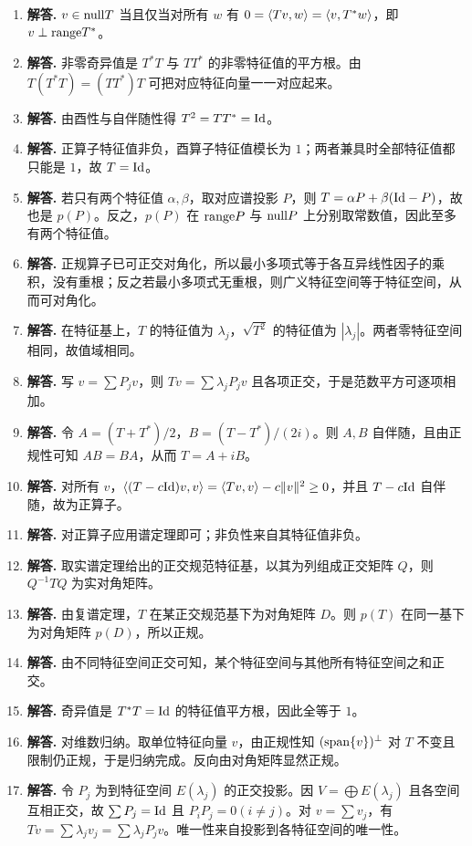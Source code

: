 \begin{enumerate}[label=\textbf{\arabic*.}, leftmargin=*, itemsep=1em]
\item \textbf{解答.} $v\in\mathrm{null} T$ 当且仅当对所有 $w$ 有 $0=\langle Tv, w \rangle=\langle v, T^*w \rangle$，即 $v\perp\mathrm{range} T^*$。
\item \textbf{解答.} 非零奇异值是 $T^*T$ 与 $TT^*$ 的非零特征值的平方根。由 $T(T^*T)=(TT^*)T$ 可把对应特征向量一一对应起来。
\item \textbf{解答.} 由酉性与自伴随性得 $T^2=TT^*=\mathrm{Id}$。
\item \textbf{解答.} 正算子特征值非负，酉算子特征值模长为 $1$；两者兼具时全部特征值都只能是 $1$，故 $T=\mathrm{Id}$。
\item \textbf{解答.} 若只有两个特征值 $\alpha,\beta$，取对应谱投影 $P$，则 $T=\alpha P+\beta(\mathrm{Id}-P)$，故也是 $p(P)$。反之，$p(P)$ 在 $\mathrm{range} P$ 与 $\mathrm{null} P$ 上分别取常数值，因此至多有两个特征值。
\item \textbf{解答.} 正规算子已可正交对角化，所以最小多项式等于各互异线性因子的乘积，没有重根；反之若最小多项式无重根，则广义特征空间等于特征空间，从而可对角化。
\item \textbf{解答.} 在特征基上，$T$ 的特征值为 $\lambda_j$，$\sqrt{T^2}$ 的特征值为 $|\lambda_j|$。两者零特征空间相同，故值域相同。
\item \textbf{解答.} 写 $v=\sum P_jv$，则 $Tv=\sum \lambda_jP_jv$ 且各项正交，于是范数平方可逐项相加。
\item \textbf{解答.} 令 $A=(T+T^*)/2$，$B=(T-T^*)/(2i)$。则 $A,B$ 自伴随，且由正规性可知 $AB=BA$，从而 $T=A+iB$。
\item \textbf{解答.} 对所有 $v$，$\langle (T-c\mathrm{Id})v, v \rangle=\langle Tv, v \rangle-c\|v\|^2\ge0$，并且 $T-c\mathrm{Id}$ 自伴随，故为正算子。
\item \textbf{解答.} 对正算子应用谱定理即可；非负性来自其特征值非负。
\item \textbf{解答.} 取实谱定理给出的正交规范特征基，以其为列组成正交矩阵 $Q$，则 $Q^{-1}TQ$ 为实对角矩阵。
\item \textbf{解答.} 由复谱定理，$T$ 在某正交规范基下为对角矩阵 $D$。则 $p(T)$ 在同一基下为对角矩阵 $p(D)$，所以正规。
\item \textbf{解答.} 由不同特征空间正交可知，某个特征空间与其他所有特征空间之和正交。
\item \textbf{解答.} 奇异值是 $T^*T=\mathrm{Id}$ 的特征值平方根，因此全等于 $1$。
\item \textbf{解答.} 对维数归纳。取单位特征向量 $v$，由正规性知 $(\operatorname{span}\{v\})^\perp$ 对 $T$ 不变且限制仍正规，于是归纳完成。反向由对角矩阵显然正规。
\item \textbf{解答.} 令 $P_j$ 为到特征空间 $E(\lambda_j)$ 的正交投影。因 $V=\bigoplus E(\lambda_j)$ 且各空间互相正交，故 $\sum P_j=\mathrm{Id}$ 且 $P_iP_j=0(i\neq j)$。对 $v=\sum v_j$，有 $Tv=\sum \lambda_jv_j=\sum \lambda_jP_jv$。唯一性来自投影到各特征空间的唯一性。

\end{enumerate}
